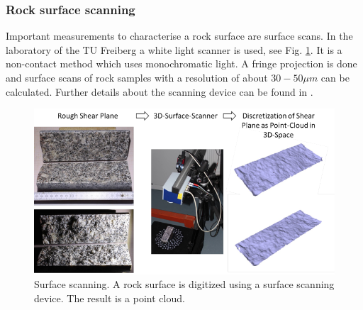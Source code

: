 \subsubsection{Rock surface scanning}

Important measurements to characterise a rock surface are surface scans. In the laboratory of the TU Freiberg a white light scanner is used, see Fig. \ref{TUBAFScanner}. It is a non-contact method which uses monochromatic light. A fringe projection is done and surface scans of rock samples with a resolution of about $30-50 \unit{\mu m}$ can be calculated. Further details about the scanning device can be found in \cite{TUBAFScanningDevice}. 

\begin{figure}[!ht]
\centering
\includegraphics[width=1.4\textwidth, angle=90]{figures/geomint-wp3-12a}
\caption{Surface scanning. A rock surface is digitized using a surface scanning device. The result is a point cloud.}\label{TUBAFScanner}
\end{figure}